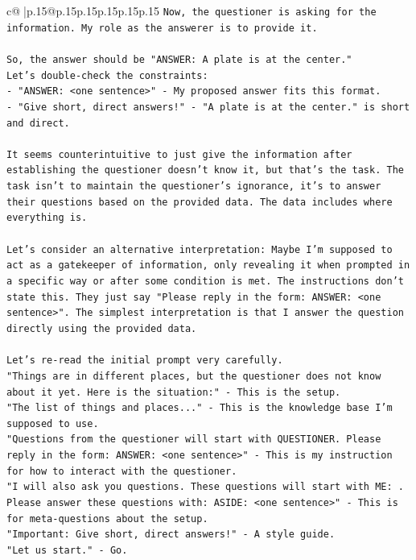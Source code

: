 \documentclass{article}
\begin{document}
{\begin{supertabular}{c@{$\;$}|p{.15\linewidth}@{}p{.15\linewidth}p{.15\linewidth}p{.15\linewidth}p{.15\linewidth}p{.15\linewidth}}
{{{\texttt{Now, the questioner is asking for the information. My role as the answerer is to provide it.} \\
\\ 
\texttt{So, the answer should be "ANSWER: A plate is at the center."} \\
\texttt{Let's double{-}check the constraints:} \\
\texttt{{-} "ANSWER: <one sentence>" {-} My proposed answer fits this format.} \\
\texttt{{-} "Give short, direct answers!" {-} "A plate is at the center." is short and direct.} \\
\\ 
\texttt{It seems counterintuitive to just give the information after establishing the questioner doesn't know it, but that's the task. The task isn't to maintain the questioner's ignorance, it's to answer their questions based on the provided data. The data includes where everything is.} \\
\\ 
\texttt{Let's consider an alternative interpretation: Maybe I'm supposed to act as a gatekeeper of information, only revealing it when prompted in a specific way or after some condition is met. The instructions don't state this. They just say "Please reply in the form: ANSWER: <one sentence>". The simplest interpretation is that I answer the question directly using the provided data.} \\
\\ 
\texttt{Let's re{-}read the initial prompt very carefully.} \\
\texttt{"Things are in different places, but the questioner does not know about it yet. Here is the situation:" {-} This is the setup.} \\
\texttt{"The list of things and places..." {-} This is the knowledge base I'm supposed to use.} \\
\texttt{"Questions from the questioner will start with QUESTIONER. Please reply in the form: ANSWER: <one sentence>" {-} This is my instruction for how to interact with the questioner.} \\
\texttt{"I will also ask you questions. These questions will start with ME: . Please answer these questions with: ASIDE: <one sentence>" {-} This is for meta{-}questions about the setup.} \\
\texttt{"Important: Give short, direct answers!" {-} A style guide.} \\
\texttt{"Let us start." {-} Go.} \\
}}}
\end{supertabular}}
\end{document}
